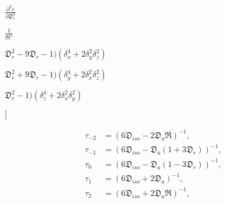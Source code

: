 \documentclass[a4paper,11pt,twoside,openright]{book}
\def\lthtmlcheckvsize{\ifdim\ht\sizebox<\vsize 
  \ifdim\wd\sizebox<\hsize\expandafter\hfill\fi \expandafter\vfill
  \else\expandafter\vss\fi}%
\begin{document}
{\newpage\clearpage
{}%
$\displaystyle {\frac{{\partial^2 e}}{{\partial \mathfrak{D}_r^2}}}$%
\lthtmlindisplaymathZ
\lthtmlcheckvsize\clearpage}

{\newpage\clearpage
{}%
$\displaystyle {\frac{{1}}{{\mathfrak{R}^5}}}$%
\lthtmlindisplaymathZ
\lthtmlcheckvsize\clearpage}

{\newpage\clearpage
{}%
$\displaystyle \mathfrak{D}_r^2 - 9\mathfrak{D}_r - 1) \left(\delta_x^4 + 2\delta_y^2\delta_z^2\right)$%
\lthtmlindisplaymathZ
\lthtmlcheckvsize\clearpage}

{\newpage\clearpage
{}%
$\displaystyle \mathfrak{D}_r^2 + 9\mathfrak{D}_r - 1) \left(\delta_y^4 + 2\delta_x^2\delta_z^2\right)$%
\lthtmlindisplaymathZ
\lthtmlcheckvsize\clearpage}

{\newpage\clearpage
{}%
$\displaystyle \mathfrak{D}_r^2 - 1) \left(\delta_z^4 + 2\delta_x^2\delta_y^2\right)$%
\lthtmlindisplaymathZ
\lthtmlcheckvsize\clearpage}

{\newpage\clearpage
{}%
$\displaystyle \bigg]$%
\lthtmlindisplaymathZ
\lthtmlcheckvsize\clearpage}

{\newpage\clearpage
\setcounter{equation}{136}
%
\begin{subequations}\begin{align}
\tau_{-2} &= (6\mathfrak{D}_{iso} - 2\mathfrak{D}_a\mathfrak{R})^{-1}, \\
\tau_{-1} &= (6\mathfrak{D}_{iso} - \mathfrak{D}_a (1 + 3\mathfrak{D}_r))^{-1}, \\
\tau_{0}  &= (6\mathfrak{D}_{iso} - \mathfrak{D}_a (1 - 3\mathfrak{D}_r))^{-1}, \\
\tau_{1}  &= (6\mathfrak{D}_{iso} + 2\mathfrak{D}_a)^{-1}, \\
\tau_{2}  &= (6\mathfrak{D}_{iso} + 2\mathfrak{D}_a\mathfrak{R})^{-1},
\end{align}\end{subequations}%
\lthtmldisplayZ
\lthtmlcheckvsize\clearpage}
\end{document}
